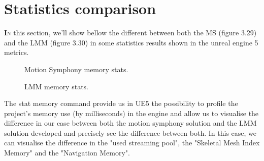 \documentclass[12pt]{book}
\begin{document}
\section{Statistics comparison}
\lettrine[findent=1pt]{\textbf{I}}{n} this section, we'll show bellow the different  between both the MS (figure 3.29) and the LMM (figure 3.30) in some statistics results shown in the unreal engine 5 metrics. 
\begin{figure}[!h]
    \centering
    \caption{Motion Symphony memory stats.}
\end{figure}
\begin{figure}[!h]
    \centering
    \caption{LMM memory stats.}
\end{figure}
The stat memory command provide us in UE5 the possibility to profile the project's memory use (by milliseconds) in the engine and allow us to visualise the difference in our case between both the motion symphony solution and the LMM solution developed and precisely see the difference between both. In this case, we can visualise the difference in the "used streaming pool", the "Skeletal Mesh Index Memory" and the "Navigation Memory".
\end{document}
